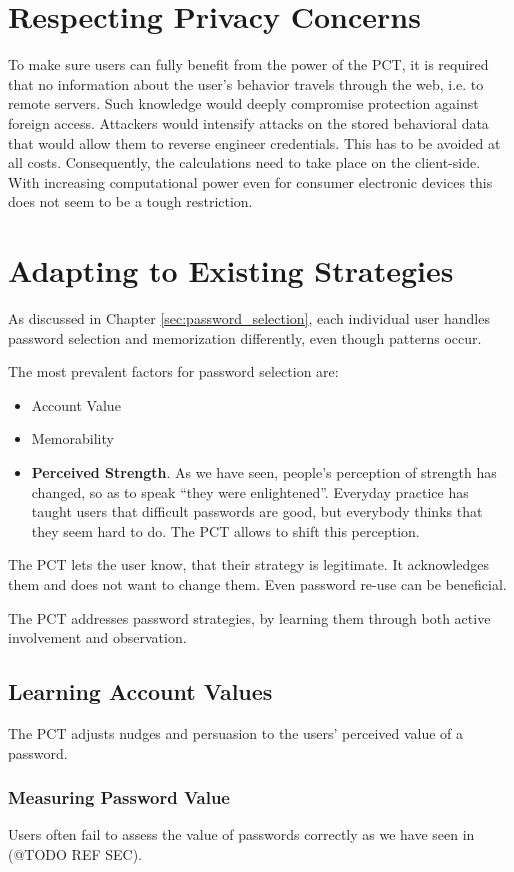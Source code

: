 \section{Respecting Privacy Concerns}
To make sure users can fully benefit from the power of the PCT, it is required that no information about the user's behavior travels through the web, i.e. to remote servers. Such knowledge would deeply compromise protection against foreign access. Attackers would intensify attacks on the stored behavioral data that would allow them to reverse engineer credentials. This has to be avoided at all costs. Consequently, the calculations need to take place on the client-side. With increasing computational power even for consumer electronic devices this does not seem to be a tough restriction. 

\section{Adapting to Existing Strategies}
As discussed in Chapter \ref{sec:password_selection}, each individual user handles password selection and memorization differently, even though patterns occur. 

The most prevalent factors for password selection are:
\begin{itemize}
\item Account Value
\item Memorability
\item \textbf{Perceived Strength}. As we have seen, people's perception of strength has changed, so as to speak ``they were enlightened''. Everyday practice has taught users that difficult passwords are good, but everybody thinks that they seem hard to do. The PCT allows to shift this perception. 
\end{itemize}

The PCT lets the user know, that their strategy is legitimate. It acknowledges them and does not want to change them.  Even password re-use can be beneficial.

The PCT addresses password strategies, by learning them through both active involvement and observation. 


\subsection{Learning Account Values}
The PCT adjusts nudges and persuasion to the users' perceived value of a password. 

\subsubsection{Measuring Password Value}
Users often fail to assess the value of passwords correctly as we have seen in (@TODO REF SEC). 

